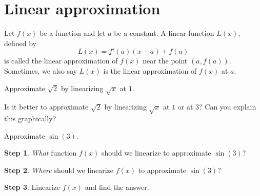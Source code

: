 \documentclass[../main.tex]{subfiles}
\begin{document}

\section{Linear approximation}

\begin{mdframed}[style=withref]
  Let \(f(x)\) be a function and let \(a\) be a constant. A linear function \(L(x)\), defined by
  \[
    L(x) = {f'(a) (x - a) + f(a)}
  \]
  is called the {linear approximation} of \(f(x)\) near the point \((a, f(a))\). Sometimes, we also say \(L(x)\) is the linear approximation of \(f(x)\) at \(a\).

\end{mdframed}
\vspace{1in}

\begin{example}
  Approximate \(\sqrt{2}\) by linearizing \(\sqrt{x}\) at \(1\).
\end{example}
\vfill{}

\begin{example}
  Is it better to approximate \(\sqrt{2}\) by linearizing \(\sqrt{x}\) at \(1\) or at \(3\)? Can you explain this graphically?
\end{example}


\clearpage

\begin{example}
  Approximate \(\sin(3)\).

  \bigskip
  \textbf{Step 1}. \emph{What} function \(f(x)\) should we linearize to approximate \(\sin(3)\)?
  \vspace{1.5in}

  \textbf{Step 2}. \emph{Where} should we linearize \(f(x)\) to approximate \(\sin(3)\)?
  \vspace{1.5in}

  \textbf{Step 3}. Linearize \(f(x)\) and find the answer.
  \vspace{2in}
\end{example}
\end{document}
